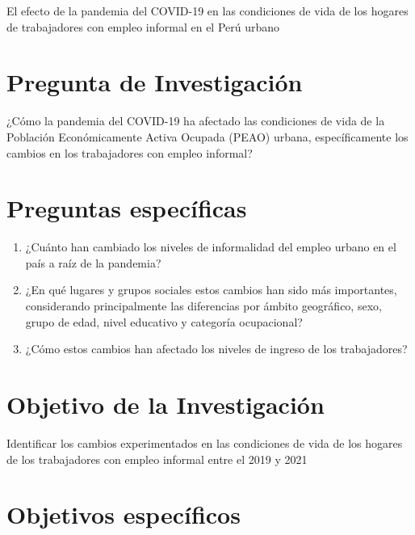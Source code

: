 \documentclass[
  letterpaper,
  12pt,
  oneside,
  spanish,
  doublespacing,
  headsepline,
  parskip]{MastersDoctoralThesis}
\begin{document}
El efecto de la pandemia del COVID-19 en las condiciones de vida de los
hogares de trabajadores con empleo informal en el Perú urbano

\hypertarget{pregunta-de-investigaciuxf3n}{%
\section{Pregunta de Investigación}\label{pregunta-de-investigaciuxf3n}}

¿Cómo la pandemia del COVID-19 ha afectado las condiciones de vida de la
Población Económicamente Activa Ocupada (PEAO) urbana, específicamente
los cambios en los trabajadores con empleo informal?

\hypertarget{preguntas-especuxedficas}{%
\section{Preguntas específicas}\label{preguntas-especuxedficas}}

\begin{enumerate}
\def\labelenumi{\arabic{enumi}.}
\item
  ¿Cuánto han cambiado los niveles de informalidad del empleo urbano en
  el país a raíz de la pandemia?
\item
  ¿En qué lugares y grupos sociales estos cambios han sido más
  importantes, considerando principalmente las diferencias por ámbito
  geográfico, sexo, grupo de edad, nivel educativo y categoría
  ocupacional?
\item
  ¿Cómo estos cambios han afectado los niveles de ingreso de los
  trabajadores?
\end{enumerate}

\hypertarget{objetivo-de-la-investigaciuxf3n}{%
\section{Objetivo de la
Investigación}\label{objetivo-de-la-investigaciuxf3n}}

Identificar los cambios experimentados en las condiciones de vida de los
hogares de los trabajadores con empleo informal entre el 2019 y 2021

\hypertarget{objetivos-especuxedficos}{%
\section{Objetivos específicos}\label{objetivos-especuxedficos}}
\end{document}
